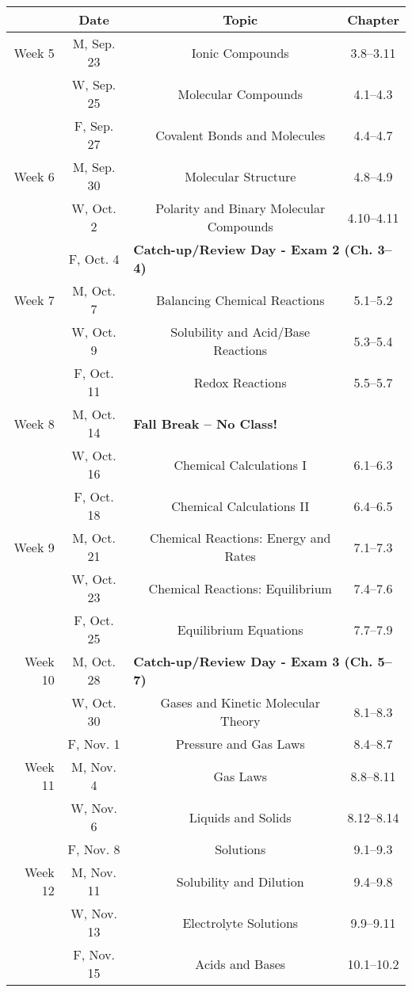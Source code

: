 \documentclass[12pt, letterpaper]{article}
\begin{document}
\noindent
\begin{tabular}{rcccc}
& Date && Topic & Chapter\\
\midrule
Week 5 & M, Sep. 23&& Ionic Compounds & 3.8--3.11\\
& W, Sep. 25&& Molecular Compounds & 4.1--4.3\\
& F, Sep. 27&& Covalent Bonds and Molecules & 4.4--4.7\\
\midrule
Week 6 & M, Sep. 30&& Molecular Structure & 4.8--4.9\\
& W, Oct. 2&& Polarity and Binary Molecular Compounds & 4.10--4.11\\
& F, Oct. 4& \multicolumn{3}{l}{\textbf{Catch-up/Review Day - Exam 2 (Ch. 3--4)}}\\
\midrule
Week 7 & M, Oct. 7&& Balancing Chemical Reactions & 5.1--5.2\\
& W, Oct. 9&& Solubility and Acid/Base Reactions & 5.3--5.4\\
& F, Oct. 11&& Redox Reactions & 5.5--5.7\\
\midrule
Week 8 & M, Oct. 14& \multicolumn{3}{l}{\textbf{Fall Break -- No Class!}}\\
& W, Oct. 16&& Chemical Calculations I & 6.1--6.3\\
& F, Oct. 18&& Chemical Calculations II & 6.4--6.5\\
\midrule
Week 9 & M, Oct. 21&& Chemical Reactions: Energy and Rates & 7.1--7.3\\
& W, Oct. 23&& Chemical Reactions: Equilibrium & 7.4--7.6\\
& F, Oct. 25&& Equilibrium Equations & 7.7--7.9\\
\midrule
Week 10 & M, Oct. 28& \multicolumn{3}{l}{\textbf{Catch-up/Review Day - Exam 3 (Ch. 5--7)}}\\
& W, Oct. 30&& Gases and Kinetic Molecular Theory & 8.1--8.3\\
& F, Nov. 1&& Pressure and Gas Laws & 8.4--8.7\\
\midrule
Week 11 & M, Nov. 4&& Gas Laws & 8.8--8.11\\
& W, Nov. 6&& Liquids and Solids & 8.12--8.14\\
& F, Nov. 8&& Solutions & 9.1--9.3\\
\midrule
Week 12 & M, Nov. 11&& Solubility and Dilution & 9.4--9.8\\
& W, Nov. 13&& Electrolyte Solutions & 9.9--9.11\\
& F, Nov. 15&& Acids and Bases & 10.1--10.2\\
\end{tabular}
\end{document}
